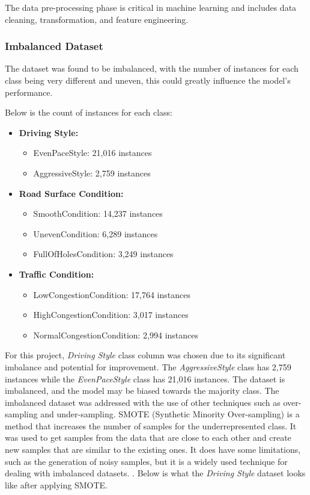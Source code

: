 \documentclass[10pt,journal,compsoc]{IEEEtran}
\begin{document}
The data pre-processing phase is critical in machine learning and includes data cleaning, transformation, and feature engineering. 


\subsubsection{Imbalanced Dataset}
The dataset was found to be imbalanced, with the number of instances for each class being very different and uneven, this could greatly influence the model's performance. 

Below is the count of instances for each class:
\begin{itemize}
    \item \textbf{Driving Style:}
    \begin{itemize}
        \item EvenPaceStyle: 21,016 instances
        \item AggressiveStyle: 2,759 instances
    \end{itemize}
    \item \textbf{Road Surface Condition:}
    \begin{itemize}
        \item SmoothCondition: 14,237 instances
        \item UnevenCondition: 6,289 instances
        \item FullOfHolesCondition: 3,249 instances
    \end{itemize}
    \item \textbf{Traffic Condition:}
    \begin{itemize}
        \item LowCongestionCondition: 17,764 instances
        \item HighCongestionCondition: 3,017 instances
        \item NormalCongestionCondition: 2,994 instances
    \end{itemize}
\end{itemize}


For this project, \textit{Driving Style} class column was chosen due to its significant imbalance and potential for improvement. 
The \textit{AggressiveStyle} class has 2,759 instances while the \textit{EvenPaceStyle} class has 21,016 instances. The dataset is imbalanced, 
and the model may be biased towards the majority class. The imbalanced dataset was addressed with the use of other techniques such as over-sampling and under-sampling.
SMOTE (Synthetic Minority Over-sampling) is a method that increases the number of samples for the underrepresented class. It was used to get samples from the data that are close to each other and create new samples that are similar to the existing ones.
It does have some limitations, such as the generation of noisy samples, but it is a widely used technique for dealing with imbalanced datasets. \cite{fernandez2018smote}. 
Below is what the \textit{Driving Style} dataset looks like after applying SMOTE.
\end{document}
